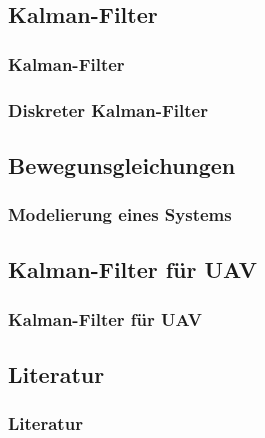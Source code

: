 \documentclass[10pt,a4paper,oneside]{beamer}
\begin{document}
\begin{frame}
  \section{Kalman-Filter}
  \frametitle{Kalman-Filter}
\end{frame}

\begin{frame}
  \frametitle{Diskreter Kalman-Filter}
  
\end{frame}

\begin{frame}
  \section{Bewegunsgleichungen}
  \frametitle{Modelierung eines Systems}
\end{frame}

\begin{frame}
  \section{Kalman-Filter für UAV}
  \frametitle{Kalman-Filter für UAV}
\end{frame}

\begin{frame}
  \section{Literatur}
  \frametitle{Literatur}
\printbibliography

\end{frame}
\end{document}
